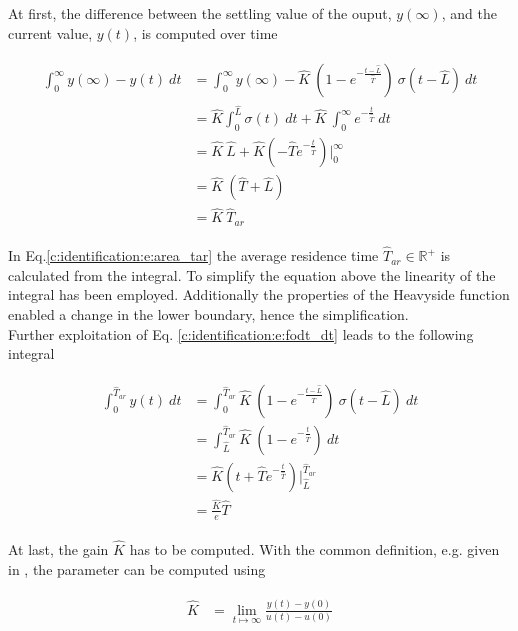 At first, the difference between the settling value of the ouput, $y(\infty)$, and the current value, $y(t)$, is computed over time

\begin{align}
\begin{split}
\int_0^\infty y(\infty)-y(t)~dt &= \int_0^\infty y(\infty) - \hat{K} ~\left( 1 - e^{-\frac{t- \hat{L}}{\hat{T}}}\right)~ \sigma(t-\hat{L}) ~dt \\
&= \hat{K} {\int_0^\hat{L}} \sigma(t) ~dt + \hat{K}~{\int^\infty_0} e^{-\frac{t}{\hat{T}}} ~dt \\
&= \hat{K}~\hat{L} + \hat{K} \left( -\hat{T} e^{-\frac{t}{\hat{T}}}\right) \Bigg\rvert^\infty_0 \\
&= \hat{K}~\left(\hat{T}+\hat{L}\right) \\
&= \hat{K}~\hat{T}_{ar}
\end{split}
\label{c:identification:e:area_tar}
\end{align}

In Eq.\ref{c:identification:e:area_tar} the average residence time $\hat{T}_{ar} \in \mathbb{R}^+$ is calculated from the integral. To simplify the equation above the linearity of the integral has been employed. Additionally the properties of the Heavyside function enabled a change in the lower boundary, hence the simplification.\\

Further exploitation of Eq. \ref{c:identification:e:fodt_dt} leads to the following integral

\begin{align}
\begin{split}
\int_0^{\hat{T}_{ar}} y(t) ~dt &= \int_0^{\hat{T}_{ar}} \hat{K} ~\left( 1 - e^{-\frac{t- \hat{L}}{\hat{T}}}\right)~ \sigma(t-\hat{L}) ~dt \\
&= \int_{\hat{L}}^{\hat{T}_{ar}} \hat{K} ~\left( 1 - e^{-\frac{t}{\hat{T}}}\right)~dt \\
&= \hat{K} \left( t + \hat{T} e^{-\frac{t}{\hat{T}}} \right) \Bigg\rvert_{\hat{L}}^{\hat{T}_{ar}} \\
&= \frac{\hat{K}}{e} \hat{T}
\end{split}
\label{c:identification:e:area_t}
\end{align}

At last, the gain $\hat{K}$ has to be computed. With the common definition, e.g. given in \cite[p.213]{Lunze2016}, the parameter can be computed using

\begin{align}
\begin{split}
\hat{K} &= \lim_{t\mapsto \infty} \frac{y(t)-y(0)}{u(t)-u(0)}
\end{split}
\label{c:identification:e:area_gain}
\end{align}

